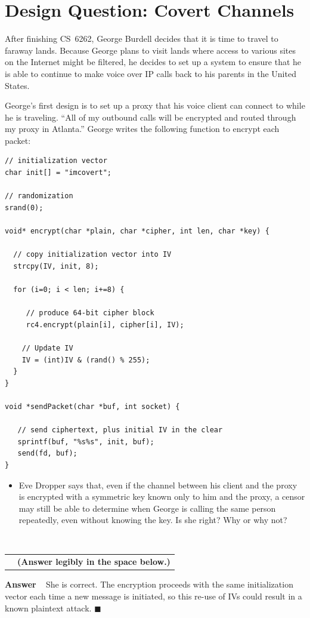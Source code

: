 \documentclass[11pt]{article}
\newcounter{pctr}
\newcommand{\ansbelow}{\probnote{Answer legibly in the space below.}}
\newcommand{\sols}[1]{#1}
\newcommand{\sols}[1]{}
\newcounter{answer}
\newenvironment{answer}[1][\relax]{\refstepcounter{answer}\begin{list}%
 {}{\leftmargin 0pt\rightmargin 0pt\labelsep 3pt\parsep 0pt%
 \setlength{\listparindent}{\parindent}}
    \item {\bf Answer \theanswer #1}\
    }{\hspace*{\fill}$\blacksquare$\end{list}}
\newcommand\prob[1]%
  {\begin{itemize}\item[]%
   \vspace{.2in}{\bf\thepctr. ~[#1~ points]:}\stepcounter{pctr}}
\newcommand\eprob{\end{itemize}}
\newcommand\probnote[1]%
  {\\\begin{tabular}{cr} \hspace{3in} & {\bf (#1)} \\ \end{tabular}}
\begin{document}
\newpage
\section{Design Question: Covert Channels}

After finishing CS~6262, George Burdell decides that it is time to
travel to faraway lands.  Because George plans to visit lands where
access to various sites on the Internet might be filtered, he decides to
set up a system to ensure that he is able to continue to make voice over
IP calls back to his parents in the United States.

George's first design is to set up a proxy that his voice client can
connect to while he is traveling.  ``All of my outbound calls will be
encrypted and routed through my proxy in Atlanta.''  George writes the
following function to encrypt each packet:

\begin{small}
\begin{verbatim}
// initialization vector
char init[] = "imcovert";

// randomization
srand(0);

void* encrypt(char *plain, char *cipher, int len, char *key) {

  // copy initialization vector into IV
  strcpy(IV, init, 8);

  for (i=0; i < len; i+=8) {

     // produce 64-bit cipher block
     rc4.encrypt(plain[i], cipher[i], IV);

    // Update IV
    IV = (int)IV & (rand() % 255);
  }
}

void *sendPacket(char *buf, int socket) {

   // send ciphertext, plus initial IV in the clear
   sprintf(buf, "%s%s", init, buf);
   send(fd, buf);
}
\end{verbatim}
\end{small}

\newpage
\prob{6} Eve Dropper says that, even if the channel between his client
and the proxy is encrypted with a symmetric key known only to him and
the proxy, a censor may still be able to determine when George is
calling the same person repeatedly, even without knowing the key.
Is she right?  Why or why not?
\eprob
~\ansbelow
\vspace*{1.5in}

\sols{
\vspace{-1.25in}
\begin{answer}
She is correct.  The encryption proceeds with the same initialization
vector each time a new message is initiated, so this re-use of IVs could
result in a known plaintext attack.
\end{answer}
}
\end{document}
